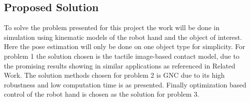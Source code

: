 \documentclass{article}
\begin{document}



  
  





\subsection*{Proposed Solution}
\label{proposed-solution}

To solve the problem presented for this project the work will be done in simulation using kinematic models of the robot hand and the object of interest. Here the pose estimation will only be done on one object type for simplicity.
For problem 1 the solution chosen is the tactile image-based contact model, due to the promising results showing in similar applications as referenced in Related Work. The solution methods chosen for problem 2 is GNC due to its high robustness and low computation time is as presented. Finally optimization based control of the robot hand is chosen as the solution for problem 3. 
\end{document}
